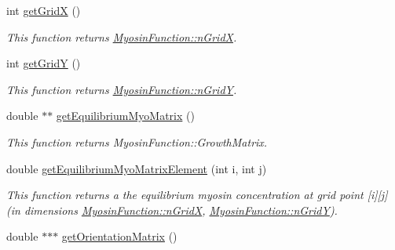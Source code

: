 \begin{DoxyCompactItemize}
\item 
\hypertarget{classMyosinFunction_a81060aaa6923f43a5a9e2dcbb11a9ac6}{}int \hyperlink{classMyosinFunction_a81060aaa6923f43a5a9e2dcbb11a9ac6}{get\+Grid\+X} ()\label{classMyosinFunction_a81060aaa6923f43a5a9e2dcbb11a9ac6}

\begin{DoxyCompactList}\small\item\em This function returns \hyperlink{classMyosinFunction_a36ac0b5ce87011878a7f1954e270e5ae}{Myosin\+Function\+::n\+Grid\+X}. \end{DoxyCompactList}\item 
\hypertarget{classMyosinFunction_ab73e8b8b716defffabf6b3bf23d606d9}{}int \hyperlink{classMyosinFunction_ab73e8b8b716defffabf6b3bf23d606d9}{get\+Grid\+Y} ()\label{classMyosinFunction_ab73e8b8b716defffabf6b3bf23d606d9}

\begin{DoxyCompactList}\small\item\em This function returns \hyperlink{classMyosinFunction_a1652a8a0d154b136434bee037e0262a4}{Myosin\+Function\+::n\+Grid\+Y}. \end{DoxyCompactList}\item 
\hypertarget{classMyosinFunction_a59fb2bb53bf315ab2740ab27f7fa7536}{}double $\ast$$\ast$ \hyperlink{classMyosinFunction_a59fb2bb53bf315ab2740ab27f7fa7536}{get\+Equilibrium\+Myo\+Matrix} ()\label{classMyosinFunction_a59fb2bb53bf315ab2740ab27f7fa7536}

\begin{DoxyCompactList}\small\item\em This function returns Myosin\+Function\+::\+Growth\+Matrix. \end{DoxyCompactList}\item 
\hypertarget{classMyosinFunction_ac8b8b7bd3c067e83f36f42930c5fd45d}{}double \hyperlink{classMyosinFunction_ac8b8b7bd3c067e83f36f42930c5fd45d}{get\+Equilibrium\+Myo\+Matrix\+Element} (int i, int j)\label{classMyosinFunction_ac8b8b7bd3c067e83f36f42930c5fd45d}

\begin{DoxyCompactList}\small\item\em This function returns a the equilibrium myosin concentration at grid point \mbox{[}i\mbox{]}\mbox{[}j\mbox{]} (in dimensions \hyperlink{classMyosinFunction_a36ac0b5ce87011878a7f1954e270e5ae}{Myosin\+Function\+::n\+Grid\+X}, \hyperlink{classMyosinFunction_a1652a8a0d154b136434bee037e0262a4}{Myosin\+Function\+::n\+Grid\+Y}). \end{DoxyCompactList}\item 
\hypertarget{classMyosinFunction_a2249447e97be176009c74d34d5219498}{}double $\ast$$\ast$$\ast$ \hyperlink{classMyosinFunction_a2249447e97be176009c74d34d5219498}{get\+Orientation\+Matrix} ()\label{classMyosinFunction_a2249447e97be176009c74d34d5219498}


\end{DoxyCompactItemize}
